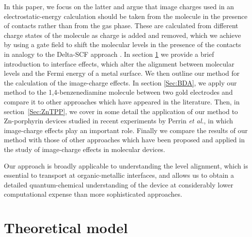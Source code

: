 \documentclass[aip,jcp,a4paper,reprint,floatfix,superscriptaddress]{revtex4-1}
\newcommand{\etal}{\emph{et al.}\xspace}
\begin{document}
In this paper, we focus on the latter and argue that image charges used in an electrostatic-energy calculation should be taken from the molecule in the presence of contacts rather than from the gas phase. These are calculated from different charge states of the molecule as charge is added and removed, which we achieve by using a gate field to shift the molecular levels in the presence of the contacts in analogy to the Delta-SCF approach \cite{Jones1989}.
In section \ref{models} we provide a brief introduction to interface effects, which alter the alignment between molecular levels and the Fermi energy of a metal surface. We then outline our method for the calculation of the image-charge effects.
In section \ref{Sec:BDA}, we apply our method to the 1,4-benzenediamine molecule between two gold electrodes and compare it to other approaches which have appeared in the literature\cite{Quek2007,Mowbray2008}. Then, in section~\ref{Sec:ZnTPP}, we cover in some detail the application of our method to Zn-porphyrin devices studied in recent experiments by Perrin \etal \cite{Perrin2013}, in which image-charge effects play an important role. Finally we compare the results of our method with those of other approaches which have been proposed and applied in the study of image-charge effects in molecular devices.\cite{Quek2007,Kaasbjerg2008,Mowbray2008}

Our approach is broadly applicable to understanding the level alignment, which is essential to transport at organic-metallic interfaces, and allows us to obtain a detailed quantum-chemical understanding of the device at considerably lower computational expense than more sophisticated approaches.




\section{Theoretical model}\label{models}
\end{document}
